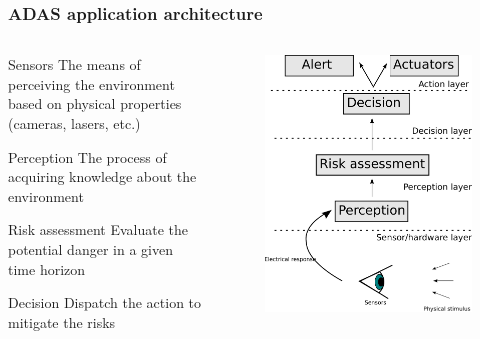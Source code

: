 \documentclass{beamer}
\begin{document}
	\begin{frame}
		\frametitle{ADAS application architecture}	
		
		\begin{columns}[t]
		  \begin{column}{6cm}
			\begin{block}{Sensors}
					The means of perceiving the environment based on physical properties (cameras, lasers, etc.)
			\end{block}		

			\begin{block}{Perception}
					The process of acquiring knowledge about the environment \cite{iyengar1991autonomous}
			\end{block}		

			\begin{block}{Risk assessment}
					Evaluate the potential danger in a given time horizon
			\end{block}				  

			\begin{block}{Decision}
					Dispatch the action to mitigate the risks
			\end{block}		
		  
		  \end{column}
		  
		  \begin{column}{6cm}
			\begin{figure}[h]
				\center
				\includegraphics[scale=0.23]{../img/fig:sensors:roles}
			\end{figure}
		  \end{column}
		 \end{columns}		
		
	\end{frame}
		
\end{document}
